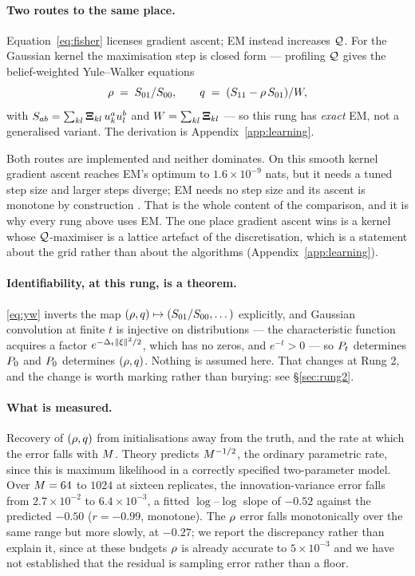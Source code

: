 \documentclass{article}
\begin{document}
\paragraph{Two routes to the same place.} Equation~\eqref{eq:fisher} licenses gradient ascent;
EM instead increases $\mathcal{Q}$. For the Gaussian kernel the maximisation step is closed form ---
profiling $\mathcal{Q}$ gives the belief-weighted Yule--Walker equations
\begin{equation}
\label{eq:yw}
\rho \;=\; S_{01}/S_{00},
\qquad
q \;=\; (S_{11} - \rho\,S_{01})/W ,
\end{equation}
with $S_{ab}=\sum_{kl}\mathbf{\Xi}_{kl}\,u_{k}^{a}u_{l}^{b}$ and $W=\sum_{kl}\mathbf{\Xi}_{kl}$ --- so
this rung has \emph{exact} EM, not a generalised variant. The derivation is
Appendix~\ref{app:learning}.

Both routes are implemented and neither dominates. On this smooth kernel gradient ascent reaches
EM's optimum to $1.6\times10^{-9}$ nats, but it needs a tuned step size and larger steps diverge;
EM needs no step size and its ascent is monotone by construction \citep{dempster1977,wu1983}.
That is the whole content of the comparison, and it is why every rung above uses EM. The one place
gradient ascent wins is a kernel whose $\mathcal{Q}$-maximiser is a lattice artefact of the
discretisation, which is a statement about the grid rather than about the algorithms
(Appendix~\ref{app:learning}).

\paragraph{Identifiability, at this rung, is a theorem.} \eqref{eq:yw} inverts the map
$(\rho,q)\mapsto(S_{01}/S_{00},\dots)$ explicitly, and Gaussian convolution at finite $t$ is
injective on distributions --- the characteristic function acquires a factor
$e^{-\Delta_t\|\xi\|^2/2}$, which has no zeros, and $e^{-t}>0$ --- so $P_t$ determines $P_0$ and
$P_0$ determines $(\rho,q)$. Nothing is assumed here. That changes at Rung 2, and the change
is worth marking rather than burying: see \S\ref{sec:rung2}.

\paragraph{What is measured.} Recovery of $(\rho,q)$ from initialisations away from the
truth, and the rate at which the error falls with $M$. Theory predicts $M^{-1/2}$, the
ordinary parametric rate, since this is maximum likelihood in a correctly specified
two-parameter model. Over $M=64$ to $1024$ at sixteen replicates, the innovation-variance
error falls from $2.7\times10^{-2}$ to $6.4\times10^{-3}$, a fitted $\log$--$\log$ slope of
$-0.52$ against the predicted $-0.50$ ($r=-0.99$, monotone). The $\rho$ error falls monotonically
over the same range but more slowly, at $-0.27$; we report the discrepancy rather than explain it,
since at these budgets $\rho$ is already accurate to $5\times10^{-3}$ and we have not established
that the residual is sampling error rather than a floor.
\end{document}
